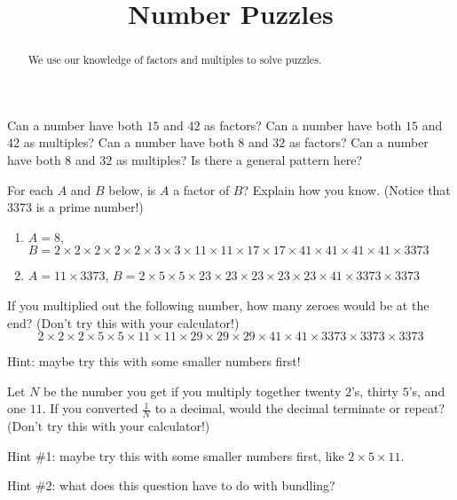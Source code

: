 \documentclass{ximera}
\title{Number Puzzles}
\begin{document}
\begin{abstract} We use our knowledge of factors and multiples to solve puzzles. \end{abstract}
\maketitle


\begin{problem}
Can a number have both $15$ and $42$ as factors? Can a number have both $15$ and $42$ as multiples? Can a number have both $8$ and $32$ as factors? Can a number have both $8$ and $32$ as multiples? Is there a general pattern here?
\vskip 0.5in
\end{problem}


\begin{problem}
For each $A$ and $B$ below, is $A$ a factor of $B$? Explain how you know. (Notice that 3373 is a prime number!)
\begin{enumerate}
\item $A = 8$, $B = 2 \times 2 \times 2 \times 2 \times 2 \times 3 \times 3 \times 11 \times 11 \times 17 \times 17 \times 41 \times 41 \times 41 \times 41  \times 3373$
\item $A = 11 \times 3373$, $B = 2 \times 5 \times 5 \times 23 \times 23 \times 23 \times 23 \times 23 \times 41 \times 3373 \times 3373$
\end{enumerate}

\vskip 0.5in
\end{problem}


\begin{problem}
If you multiplied out the following number, how many zeroes would be at the end? (Don't try this with your calculator!)
\[
2 \times 2 \times 2 \times 5 \times 5 \times 11 \times 11 \times 29 \times 29 \times 29 \times 41 \times 41 \times 3373 \times 3373 \times 3373
\]
\vskip 0.5in

Hint: maybe try this with some smaller numbers first!
\vskip 0.5in
\end{problem}



\begin{problem}
Let $N$ be the number you get if you multiply together twenty $2$'s, thirty $5$'s, and one $11$. If you converted $\frac{1}{N}$ to a decimal, would the decimal terminate or repeat? (Don't try this with your calculator!)
\vskip 0.5in

Hint \#1: maybe try this with some smaller numbers first, like $2 \times 5 \times 11$.

Hint \#2: what does this question have to do with bundling?
\vskip 0.5in
\end{problem}
\end{document}
